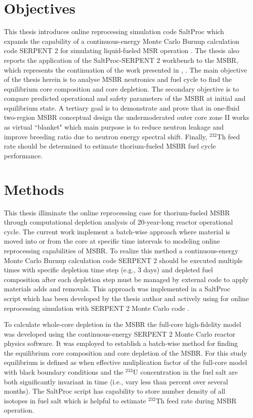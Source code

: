 \section{Objectives}
This thesis introduces online reprocessing simulation code SaltProc which expands the capability of a continuous-energy Monte Carlo Burnup calculation code SERPENT 2 for simulating liquid-fueled \gls{MSR} operation \cite{andrei_rykhlevskii_arfc/saltproc:_2018}. The thesis also reports the application of the SaltProc-SERPENT 2 workbench to the \gls{MSBR}, which represents the continuation of the work presented in \cite{rykhlevskii_full-core_2017}, \cite{rykhlevskii_online_2017}. The main objective of the thesis herein is to analyse \gls{MSBR} neutronics and fuel cycle to find the equilibrium core composition and core depletion. The secondary objective is to compare predicted operational and safety parameters of the \gls{MSBR} at initial and equilibrium state. A tertiary goal is to demonstrate and prove that in one-fluid two-region \gls{MSBR} conceptual design the undermoderated outer core zone II works as virtual ``blanket" which main purpose is to reduce neutron leakage and improve breeding ratio due to neutron energy spectral shift. Finally, $^{232}$Th feed rate should be determined to estimate thorium-fueled \gls{MSBR} fuel cycle performance.

\section{Methods}
This thesis illiminate the online reprocessing case for thorium-fueled \gls{MSBR} through computational depletion analysis of 20-year-long reactor operational cycle. The current work implement a batch-wise approach where material is moved into or from the core at specific time intervals to modeling online reprocessing capabilities of \gls{MSBR}. To realize this method a continuous-energy Monte Carlo Burnup calculation code SERPENT 2 should be executed multiple times with specific depletion time step (e.g., 3 days) and depleted fuel composition after each depletion step  must be managed by external code to apply materials adds and removals. This approach was implemented in a SaltProc script \cite{andrei_rykhlevskii_arfc/saltproc:_2018} which has been developed by the thesis author and actively using for online reprocessing simulation with SERPENT 2 Monte Carlo code \cite{leppanen_serpent_2015}. 

To calculate whole-core depletion in the \gls{MSBR} the full-core high-fidelity model was developed using the continuous-energy SERPENT 2 Monte Carlo reactor physics software. It was employed to establish a batch-wise method for finding the equilibrium core composition and core depletion of the \gls{MSBR}. For this study equilibrium is defined as when effective muliplication factor of the full-core model with black boundary conditions and the $^{233}$U concentration in the fuel salt are both significantly invariant in time (i.e., vary less than percent over several months). The SaltProc script has capability to store number density of all isotopes in fuel salt which is helpful to estimate $^{232}$Th feed rate during \gls{MSBR} operation.

